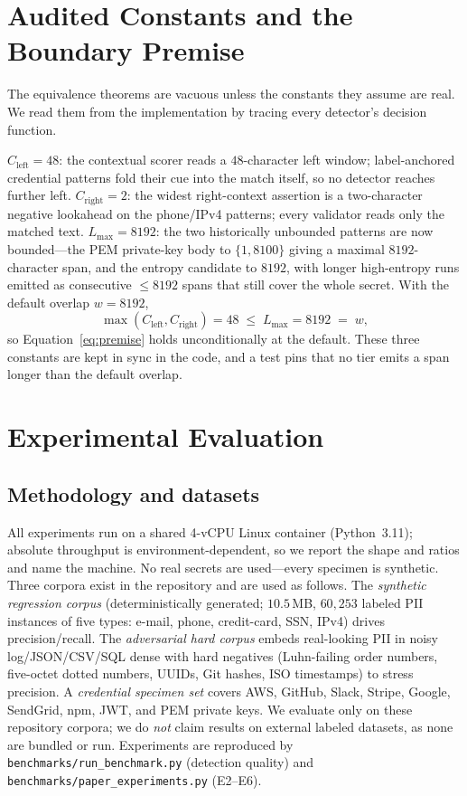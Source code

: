 \documentclass[conference]{IEEEtran}
\begin{document}
\section{Audited Constants and the Boundary Premise}\label{sec:constants}

The equivalence theorems are vacuous unless the constants they assume are real.
We read them from the implementation by tracing every detector's decision
function.

$C_{\mathrm{left}}=48$: the contextual scorer reads a $48$-character left window;
label-anchored credential patterns fold their cue into the match itself, so no
detector reaches further left. $C_{\mathrm{right}}=2$: the widest right-context
assertion is a two-character negative lookahead on the phone/IPv4 patterns; every
validator reads only the matched text. $L_{\max}=8192$: the two historically
unbounded patterns are now bounded---the PEM private-key body to $\{1,8100\}$
giving a maximal $8192$-character span, and the entropy candidate to $8192$, with
longer high-entropy runs emitted as consecutive $\le 8192$ spans that still cover
the whole secret. With the default overlap $w=8192$,
\[
\max(C_{\mathrm{left}},C_{\mathrm{right}})=48\;\le\;L_{\max}=8192\;=\;w,
\]
so Equation~\eqref{eq:premise} holds unconditionally at the default. These three
constants are kept in sync in the code, and a test pins that no tier emits a span
longer than the default overlap.

\section{Experimental Evaluation}\label{sec:eval}

\subsection{Methodology and datasets}

All experiments run on a shared 4-vCPU Linux container (Python~3.11); absolute
throughput is environment-dependent, so we report the shape and ratios and name
the machine. No real secrets are used---every specimen is synthetic. Three corpora
exist in the repository and are used as follows. The \emph{synthetic regression
corpus} (deterministically generated; $10.5$\,MB, $60{,}253$ labeled PII instances
of five types: e-mail, phone, credit-card, SSN, IPv4) drives precision/recall. The
\emph{adversarial hard corpus} embeds real-looking PII in noisy log/JSON/CSV/SQL
dense with hard negatives (Luhn-failing order numbers, five-octet dotted numbers,
UUIDs, Git hashes, ISO timestamps) to stress precision. A \emph{credential
specimen set} covers AWS, GitHub, Slack, Stripe, Google, SendGrid, npm, JWT, and
PEM private keys. We evaluate only on these repository corpora; we do \emph{not}
claim results on external labeled datasets, as none are bundled or run.
Experiments are reproduced by \texttt{benchmarks/run\_benchmark.py} (detection
quality) and \texttt{benchmarks/paper\_experiments.py} (E2--E6).
\end{document}
